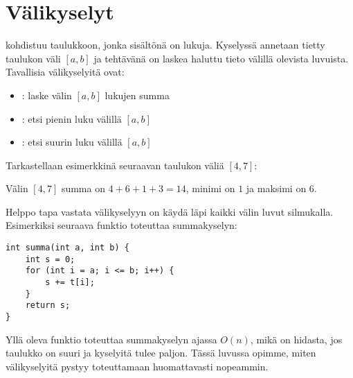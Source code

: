 \chapter{Välikyselyt}


 kohdistuu
taulukkoon, jonka sisältönä on lukuja.
Kyselyssä annetaan tietty taulukon väli $[a,b]$
ja tehtävänä on laskea haluttu tieto välillä olevista luvuista.
Tavallisia välikyselyitä ovat:

\begin{itemize}
\item {}: laske välin $[a,b]$ lukujen summa
\item {}: etsi pienin luku välillä $[a,b]$
\item {}: etsi suurin luku välillä $[a,b]$
\end{itemize}

\noindent
Tarkastellaan esimerkkinä seuraavan taulukon väliä $[4,7]$:

\begin{center}
\end{center}

Välin $[4,7]$ summa on $4+6+1+3=14$, minimi on $1$
ja maksimi on $6$.

Helppo tapa vastata välikyselyyn on
käydä läpi kaikki välin luvut silmukalla.
Esimerkiksi seuraava funktio toteuttaa summakyselyn:

\begin{lstlisting}
int summa(int a, int b) {
    int s = 0;
    for (int i = a; i <= b; i++) {
        s += t[i];
    }
    return s;
}
\end{lstlisting}

Yllä oleva funktio toteuttaa summakyselyn
ajassa $O(n)$, mikä on hidasta,
jos taulukko on suuri ja kyselyitä tulee paljon.
Tässä luvussa opimme, miten välikyselyitä pystyy
toteuttamaan huomattavasti nopeammin.

